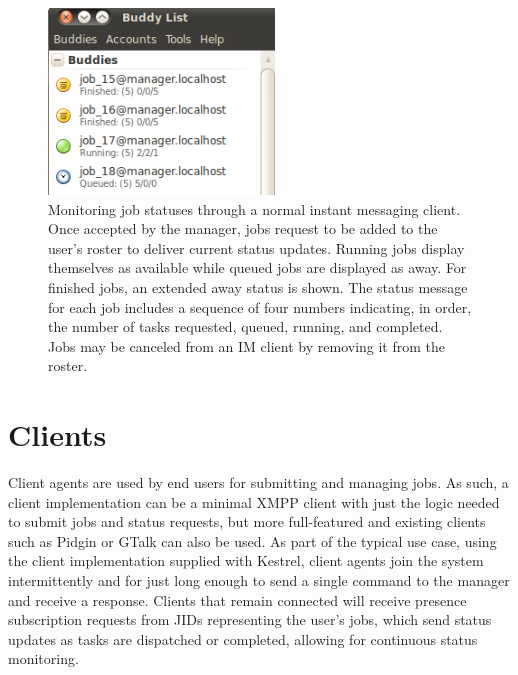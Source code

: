 \begin{figure}
\begin{center}
\includegraphics[width=6cm]{figures/im_client}
\end{center}
\caption{\label{fig:IM-Client} Monitoring job statuses through a normal instant
messaging client. Once accepted by the manager, jobs request to be
added to the user's roster to deliver current status updates. Running
jobs display themselves as available while queued jobs are displayed
as away. For finished jobs, an extended away status is shown. The
status message for each job includes a sequence of four numbers indicating,
in order, the number of tasks requested, queued, running, and completed.
Jobs may be canceled from an IM client by removing it from the roster.}
\end{figure}

\section{Clients}
Client agents are used by end users for submitting and managing jobs. As such,
a client implementation can be a minimal XMPP client with just the logic needed
to submit jobs and status requests, but more full-featured and existing clients
such as Pidgin \cite{Pidgin} or GTalk \cite{GTalk} can also be used. As part of
the typical use case, using the client implementation supplied with Kestrel,
client agents join the system intermittently and for just long enough to send a
single command to the manager and receive a response. Clients that remain connected
will receive presence subscription requests from JIDs representing the user's jobs,
which send status updates as tasks are dispatched or completed, allowing for 
continuous status monitoring.


